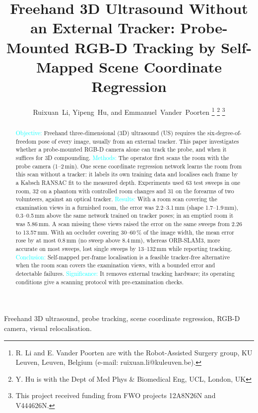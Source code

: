 \documentclass[9pt,shortpaper,twoside,web]{ieeecolor2}
\begin{document}
\title{Freehand 3D Ultrasound Without an External Tracker: Probe-Mounted RGB-D Tracking by Self-Mapped Scene Coordinate Regression}

\author{Ruixuan~Li, Yipeng~Hu, and Emmanuel~Vander~Poorten%
\thanks{R. Li and E. Vander Poorten are with the Robot-Assisted Surgery group, KU Leuven, Leuven, Belgium (e-mail: ruixuan.li@kuleuven.be).}%
\thanks{Y. Hu is with the Dept of Med Phys \& Biomedical Eng, UCL, London, UK}
\thanks{This project received funding from FWO projects 12A8N26N and V444626N.}}

\maketitle

\begin{abstract}
\textcolor{cyan}{Objective:} Freehand three-dimensional (3D) ultrasound (US) requires the six-degree-of-freedom pose of every image, usually from an external tracker. This paper investigates whether a probe-mounted RGB-D camera alone can track the probe, and when it suffices for 3D compounding. \textcolor{cyan}{Methods:} The operator first scans the room with the probe camera (1--2\,min). One scene coordinate regression network learns the room from this scan without a tracker: it labels its own training data and localises each frame by a Kabsch RANSAC fit to the measured depth. Experiments used 63 test sweeps in one room, 32 on a phantom with controlled room changes and 31 on the forearms of two volunteers, against an optical tracker. \textcolor{cyan}{Results:} With a room scan covering the examination views in a furnished room, the error was 2.2--3.1\,mm (shape 1.7--1.9\,mm), 0.3--0.5\,mm above the same network trained on tracker poses; in an emptied room it was 5.86\,mm. A scan missing these views raised the error on the same sweeps from 2.26 to 13.57\,mm. With an occluder covering 30--60\,\% of the image width, the mean error rose by at most 0.8\,mm (no sweep above 8.4\,mm), whereas ORB-SLAM3, more accurate on most sweeps, lost single sweeps by 13--132\,mm while reporting tracking. \textcolor{cyan}{Conclusion:} Self-mapped per-frame localisation is a feasible tracker-free alternative when the room scan covers the examination views, with a bounded error and detectable failures. \textcolor{cyan}{Significance:} It removes external tracking hardware; its operating conditions give a scanning protocol with pre-examination checks.
\end{abstract}


\begin{IEEEkeywords}
Freehand 3D ultrasound, probe tracking, scene coordinate regression, RGB-D camera, visual relocalisation.
\end{IEEEkeywords}
\end{document}

